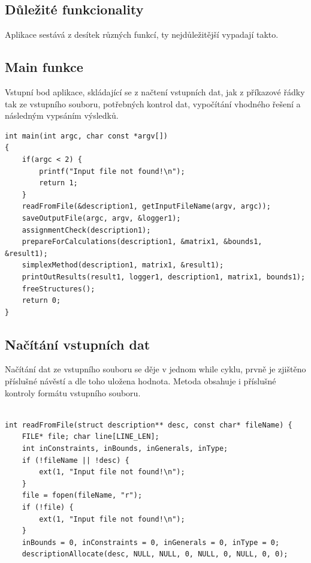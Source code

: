 \documentclass[
12pt,
a4paper,
pdftex,
czech,
titlepage
]{report}
\begin{document}
\begin{itemize}[label={}]
\section{Důležité funkcionality}
Aplikace sestává z desítek různých funkcí, ty nejdůležitější vypadají takto.  

\subsection{Main funkce}
Vstupní bod aplikace, skládající se z načtení vstupních dat, jak z příkazové řádky tak ze vstupního souboru, potřebných kontrol dat, vypočítání vhodného řešení a následným vypsáním výsledků.

\begin{lstlisting}
int main(int argc, char const *argv[])
{
    if(argc < 2) {
        printf("Input file not found!\n");
        return 1;
    }
    readFromFile(&description1, getInputFileName(argv, argc));
    saveOutputFile(argc, argv, &logger1);
    assignmentCheck(description1);
    prepareForCalculations(description1, &matrix1, &bounds1, &result1);
    simplexMethod(description1, matrix1, &result1);
    printOutResults(result1, logger1, description1, matrix1, bounds1);
    freeStructures();
    return 0;
}
\end{lstlisting}

\subsection{Načítání vstupních dat}
Načítání dat ze vstupního souboru se děje v jednom while cyklu, prvně je zjištěno příslušné návěstí a dle toho uložena hodnota.
Metoda obsahuje i příslušné kontroly formátu vstupního souboru.

\begin{lstlisting}
    
int readFromFile(struct description** desc, const char* fileName) {
    FILE* file; char line[LINE_LEN];
    int inConstraints, inBounds, inGenerals, inType;
    if (!fileName || !desc) {
        ext(1, "Input file not found!\n");
    }
    file = fopen(fileName, "r");
    if (!file) {
        ext(1, "Input file not found!\n");
    }
    inBounds = 0, inConstraints = 0, inGenerals = 0, inType = 0;
    descriptionAllocate(desc, NULL, NULL, 0, NULL, 0, NULL, 0, 0);


\end{lstlisting}
\end{itemize}
\end{document}
